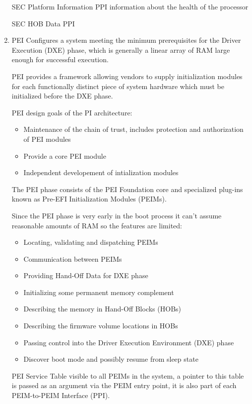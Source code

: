 \begin{enumerate}
    SEC Platform Information PPI
    information about the health of the processor

    SEC HOB Data PPI

    \item{\acf{PEI}}
    Configures a system meeting the minimum prerequisites for the Driver Execution (DXE) phase, which is generally a linear array of RAM large enough for successful execution.

    PEI provides a framework allowing vendors to supply initialization modules for each functionally distinct piece of system hardware which must be initialized before the DXE phase.

    PEI design goals of the PI architecture:
    \begin{itemize}
        \item Maintenance of the chain of trust, includes protection and authorization of PEI modules
        \item Provide a core PEI module
        \item Independent developement of intialization modules
    \end{itemize}
    The PEI phase consists of the PEI Foundation core and specialized plug-ins known as Pre-EFI Initialization Modules (PEIMs).

    Since the PEI phase is very early in the boot process it can't assume reasonable amounts of RAM so the features are limited:
    \begin{itemize}
        \item Locating, validating and dispatching PEIMs
        \item Communication between PEIMs
        \item Providing Hand-Off Data for DXE phase
        \item Initializing some permanent memory complement
        \item Describing the memory in Hand-Off Blocks (HOBs)
        \item Describing the firmware volume locations in HOBs
        \item Passing control into the Driver Execution Environment (DXE) phase
        \item Discover boot mode and possibly resume from sleep state
    \end{itemize}
    PEI Service Table visible to all PEIMs in the system, a pointer to this table is passed as an argument via the PEIM entry point, it is also part of each PEIM-to-PEIM Interface (PPI).



\end{enumerate}
